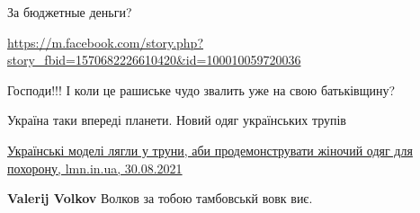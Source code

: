 \begin{itemize}
\begin{itemize}
 
За бюджетные деньги?
\end{itemize}

 
\url{https://m.facebook.com/story.php?story_fbid=1570682226610420&id=100010059720036}

 
Господи!!! І коли це рашиське чудо звалить уже на свою батьківщину?

 
Україна таки впереді планети.
Новий одяг українських трупів

\href{https://www.lmn.in.ua/ukrainski-modeli-liahly-u-truny-aby-prodemonstruvaty-zhinochyj-odiah-dlia-pokhoronu/}{%
Українські моделі лягли у труни, аби продемонструвати жіночий одяг для похорону, lmn.in.ua, 30.08.2021%
}

\begin{itemize}
 
\textbf{Valerij Volkov} Волков за тобою тамбовськй вовк виє.

 

\end{itemize}
\end{itemize}

